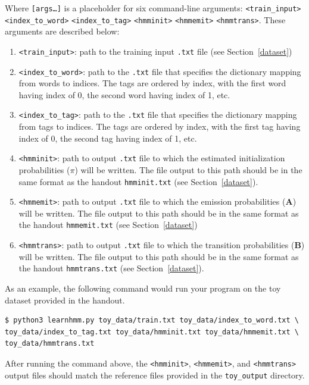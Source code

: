\documentclass[11pt,addpoints,answers]{exam}
\begin{document}
Where \texttt{[args\dots]} is a placeholder for six command-line arguments: \texttt{<train\_input>} \texttt{<index\_to\_word>} \texttt{<index\_to\_tag>} \texttt{<hmminit>} \texttt{<hmmemit>} \texttt{<hmmtrans>}. These arguments are described below:
\begin{enumerate}
    \item \texttt{<train\_input>}: path to the training input \texttt{.txt} file (see Section~\ref{dataset})
    \item \texttt{<index\_to\_word>}: path to the \texttt{.txt} file that specifies the dictionary mapping from words to indices. The tags are ordered by index, with the first word having index of 0, the second word having index of 1, etc.
    \item \texttt{<index\_to\_tag>}: path to the \texttt{.txt} file that specifies the dictionary mapping from tags to indices. The tags are ordered by index, with the first tag having index of 0, the second tag having index of 1, etc.
    \item \texttt{<hmminit>}: path to output \texttt{.txt} file to which the estimated initialization probabilities (\boldmath${\pi}$) will be written. The file output to this path should be in the same format as the handout \texttt{hmminit.txt} (see Section~\ref{dataset}).
    \item \texttt{<hmmemit>}: path to output \texttt{.txt} file to which the emission probabilities ($\mathbf A$) will be written. The file output to this path should be in the same format as the handout \texttt{hmmemit.txt} (see Section~\ref{dataset})
    \item \texttt{<hmmtrans>}: path to output \texttt{.txt} file to which the transition probabilities ($\mathbf B$) will be written. The file output to this path should be in the same format as the handout \texttt{hmmtrans.txt} (see Section~\ref{dataset}).
\end{enumerate}
\vspace{0.2 in}
As an example, the following command would run your program on the toy dataset provided in the
handout.
\begin{lstlisting}
$ python3 learnhmm.py toy_data/train.txt toy_data/index_to_word.txt \ 
toy_data/index_to_tag.txt toy_data/hmminit.txt toy_data/hmmemit.txt \ 
toy_data/hmmtrans.txt
\end{lstlisting}

After running the command above, the \texttt{<hmminit>}, \texttt{<hmmemit>}, and \texttt{<hmmtrans>} output files should match the reference files provided in the \texttt{toy\_output} directory.
\end{document}
